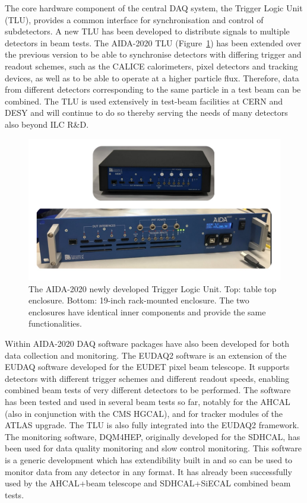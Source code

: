 The core hardware component of the central DAQ system, the Trigger Logic Unit (TLU), provides a common interface for synchronisation and control of subdetectors. A new TLU has been developed to distribute signals to multiple detectors in beam tests. The AIDA-2020 TLU (Figure~\ref{fig:integration:DAQ_TLU}) has been extended over the previous version to be able to synchronise detectors with differing trigger and readout schemes, such as the CALICE calorimeters, pixel detectors and tracking devices, as well as to be able to operate at a higher particle flux. Therefore, data from different detectors corresponding to the same particle in a test beam can be combined. The TLU is used extensively in test-beam facilities at CERN and DESY and will continue to do so thereby serving the needs of many detectors also beyond ILC R\&D. 

\begin{figure}[t!]
\includegraphics[width=1.0\hsize]{Integration/fig/DAQ_TLU.jpg}
\caption{\label{fig:integration:DAQ_TLU}The AIDA-2020 newly developed Trigger Logic Unit. Top: table top enclosure. Bottom: 19-inch rack-mounted enclosure. The two enclosures have identical inner components and provide the same functionalities.}
\end{figure}

Within AIDA-2020 DAQ software packages have also been developed for both data collection and monitoring. The EUDAQ2 software is an extension of the EUDAQ software developed for the EUDET pixel beam telescope. It supports detectors with different trigger schemes and different readout speeds, enabling combined beam tests of very different detectors to be performed. The software has been tested and used in several beam tests so far, notably for the AHCAL (also in conjunction with the CMS HGCAL), and for tracker modules of the ATLAS upgrade.  The TLU is also fully integrated into the EUDAQ2 framework. The monitoring software, DQM4HEP, originally developed for the SDHCAL, has been used for data quality monitoring and slow control monitoring. This software is a generic development which has extendibility built in and so can be used to monitor data from any detector in any format. It has already been successfully used by the AHCAL+beam telescope and SDHCAL+SiECAL combined beam tests. 

